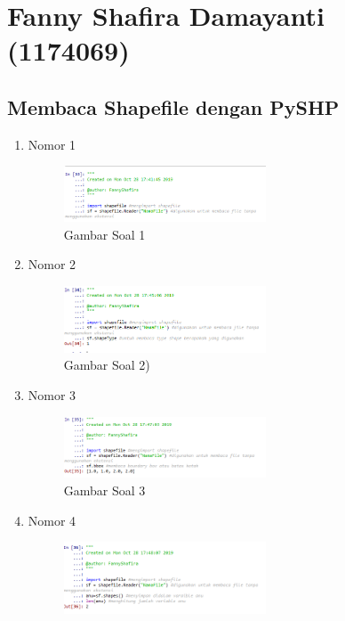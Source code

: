 \section{Fanny Shafira Damayanti (1174069)}
\subsection{Membaca Shapefile dengan PySHP}
\begin{enumerate}
	\item Nomor 1
	
	\begin{figure}[H]
		\includegraphics[width=6cm]{figures/Tugas3/1174069/soal1.png}
		\centering
		\caption{Gambar Soal 1}
	\end{figure}
	\item Nomor 2
	
	\begin{figure}[H]
		\includegraphics[width=6cm]{figures/Tugas3/1174069/soal2.png}
		\centering
		\caption{Gambar Soal 2)}
	\end{figure}
	\item Nomor 3
	
	\begin{figure}[H]
		\includegraphics[width=6cm]{figures/Tugas3/1174069/soal3.png}
		\centering
		\caption{Gambar Soal 3}
	\end{figure}
	\item Nomor 4
	
	\begin{figure}[H]
		\includegraphics[width=6cm]{figures/Tugas3/1174069/soal4.png}

\end{figure}
\end{enumerate}
